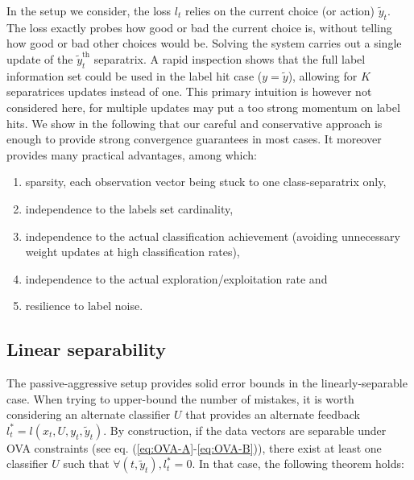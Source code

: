 \documentclass[preprint,12pt,authoryear]{elsarticle}
\begin{document}
In the setup we consider, the loss $l_t$ relies on the current choice (or action) $\tilde{y}_t$. The loss exactly probes how good or bad the current choice is, without telling how good or bad other choices would be. Solving the system carries out a single update of the  $\tilde{y}_t^\text{th}$ separatrix. 
A rapid inspection shows that the full label information set could be used in the label hit case ($y = \tilde{y}$), allowing for $K$ separatrices updates instead of one. This primary intuition is however not considered here, for multiple updates may put a too strong momentum on label hits.  
We show in the following that our careful and conservative approach %
is enough to provide strong convergence guarantees in most cases. 
It moreover provides many practical advantages, among which:
\begin{enumerate}
	\item sparsity, each observation vector being stuck to one class-separatrix only, 
	\item independence to the labels set cardinality, 
	\item independence to the actual classification achievement (avoiding unnecessary weight updates at high classification rates), 
	\item independence to the actual exploration/exploitation rate and 
	\item resilience to label noise.
\end{enumerate}


\subsection{Linear separability}
The passive-aggressive setup provides solid error bounds in the linearly-separable case. 
When trying to upper-bound the number of mistakes, it is worth considering an alternate classifier $U$ that provides an alternate feedback $l^*_t = l(x_t,U,y_t,\tilde{y}_t)$. By construction, if the data vectors are separable under OVA constraints (see eq. (\ref{eq:OVA-A}-\ref{eq:OVA-B})), there exist at least one classifier $U$ such that $\forall (t, \tilde{y}_t), l^*_t = 0$. In that case, the following theorem holds:

\end{document}
